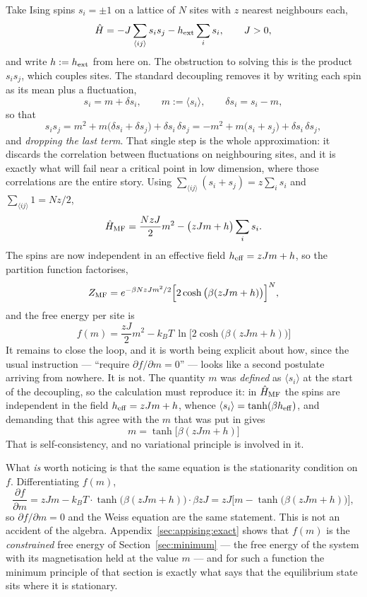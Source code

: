 \documentclass[10pt,a4paper]{article}
\theoremstyle{remark}
\begin{document}
Take Ising spins $s_i=\pm1$ on a lattice of $N$ sites with $z$ nearest neighbours
each,
\[
\hat H=-J\sum_{\langle ij\rangle}s_is_j-h_{\rm ext}\sum_i s_i ,
\qquad J>0 ,
\]
and write $h:= h_{\rm ext}$ from here on. The obstruction to solving this is
the product $s_is_j$, which couples sites. The standard decoupling removes it by
writing each spin as its mean plus a fluctuation,
\[
s_i=m+\delta s_i,\qquad m:=\langle s_i\rangle,\qquad \delta s_i=s_i-m ,
\]
so that
\[
s_is_j=m^{2}+m\big(\delta s_i+\delta s_j\big)+\delta s_i\,\delta s_j
=-m^{2}+m\big(s_i+s_j\big)+\delta s_i\,\delta s_j ,
\]
and \emph{dropping the last term}. That single step is the whole approximation: it
discards the correlation between fluctuations on neighbouring sites, and it is
exactly what will fail near a critical point in low dimension, where those
correlations are the entire story. Using $\sum_{\langle ij\rangle}(s_i+s_j)=z\sum_i
s_i$ and $\sum_{\langle ij\rangle}1=Nz/2$,
\[
\hat H_{\rm MF}=\frac{NzJ}{2}m^{2}-\big(zJm+h\big)\sum_i s_i .
\]
The spins are now independent in an effective field $h_{\rm eff}=zJm+h$, so the
partition function factorises,
\[
Z_{\rm MF}=e^{-\beta NzJm^{2}/2}\Big[2\cosh\big(\beta(zJm+h)\big)\Big]^{N} ,
\]
and the free energy per site is
\[
\;
f(m)=\frac{zJ}{2}m^{2}-k_BT\,\ln\Big[2\cosh\big(\beta(zJm+h)\big)\Big]\
\]
It remains to close the loop, and it is worth being explicit about how, since
the usual instruction --- ``require $\partial f/\partial m=0$'' --- looks like a
second postulate arriving from nowhere. It is not. The quantity $m$ was
\emph{defined} as $\langle s_i\rangle$ at the start of the decoupling, so the
calculation must reproduce it: in $\hat H_{\rm MF}$ the spins are independent in the
field $h_{\rm eff}=zJm+h$, whence $\langle s_i\rangle=\tanh(\beta h_{\rm eff})$,
and demanding that this agree with the $m$ that was put in gives
\[
\;m=\tanh\big[\beta(zJm+h)\big]\
\]
That is self-consistency, and no variational principle is involved in it.

What \emph{is} worth noticing is that the same equation is the stationarity
condition on $f$. Differentiating $f(m)$,
\[
\frac{\partial f}{\partial m}
=zJm-k_BT\cdot\tanh\big(\beta(zJm+h)\big)\cdot\beta zJ
=zJ\Big[m-\tanh\big(\beta(zJm+h)\big)\Big],
\]
so $\partial f/\partial m=0$ and the Weiss equation are the same statement. This
is not an accident of the algebra. Appendix~\ref{sec:appising:exact} shows that
$f(m)$ is the \emph{constrained} free energy of Section~\ref{sec:minimum} --- the
free energy of the system with its magnetisation held at the value $m$ --- and
for such a function the minimum principle of that section is exactly what says
that the equilibrium state sits where it is stationary.
\end{document}
